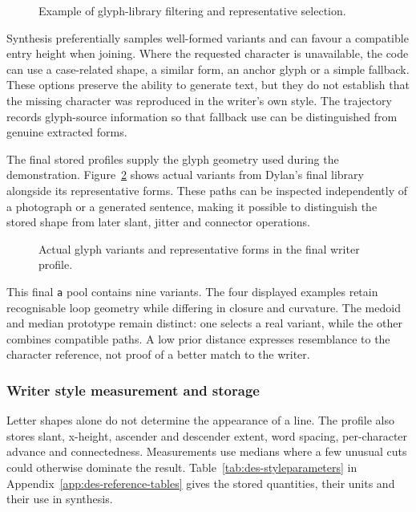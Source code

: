 \begin{figure}[!htbp]\centering
{}
\caption{Example of glyph-library filtering and representative selection.}
\label{fig:des-glyphquality}
\end{figure}

Synthesis preferentially samples well-formed variants and can favour a compatible entry height when joining. Where the requested character is unavailable, the code can use a case-related shape, a similar form, an anchor glyph or a simple fallback. These options preserve the ability to generate text, but they do not establish that the missing character was reproduced in the writer's own style. The trajectory records glyph-source information so that fallback use can be distinguished from genuine extracted forms.

The final stored profiles supply the glyph geometry used during the demonstration. Figure~\ref{fig:des-profile-example} shows actual variants from Dylan's final library alongside its representative forms. These paths can be inspected independently of a photograph or a generated sentence, making it possible to distinguish the stored shape from later slant, jitter and connector operations.


\begin{figure}[!htbp]\centering
{}
\caption{Actual glyph variants and representative forms in the final writer profile.}
\label{fig:des-profile-example}
\end{figure}

This final \texttt{a} pool contains nine variants. The four displayed examples retain recognisable loop geometry while differing in closure and curvature. The medoid and median prototype remain distinct: one selects a real variant, while the other combines compatible paths. A low prior distance expresses resemblance to the character reference, not proof of a better match to the writer.


\subsubsection{Writer style measurement and storage}
\label{sec:des-profile}
Letter shapes alone do not determine the appearance of a line. The profile also stores slant, x-height, ascender and descender extent, word spacing, per-character advance and connectedness. Measurements use medians where a few unusual cuts could otherwise dominate the result. Table~\ref{tab:des-styleparameters} in Appendix~\ref{app:des-reference-tables} gives the stored quantities, their units and their use in synthesis.

